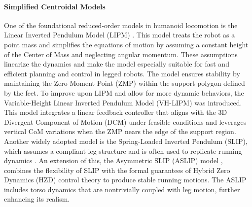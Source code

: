 \documentclass[main.tex]{subfiles}
\begin{document}
\paragraph{Simplified Centroidal Models} One of the foundational reduced-order models in humanoid locomotion is the Linear Inverted Pendulum Model (LIPM) \cite{kajita1991study}. This model treats the robot as a point mass and simplifies the equations of motion by assuming a constant height of the Center of Mass and neglecting angular momentum. These assumptions linearize the dynamics and make the model especially suitable for fast and efficient planning and control in legged robots. The model ensures stability by maintaining the Zero Moment Point (ZMP) within the support polygon defined by the feet. To improve upon LIPM and allow for more dynamic behaviors, the Variable-Height Linear Inverted Pendulum Model (VH-LIPM) \cite{caron2020biped} was introduced. This model integrates a linear feedback controller that aligns with the 3D Divergent Component of Motion (DCM) \cite{englsberger2015three} under feasible conditions and leverages vertical CoM variations when the ZMP nears the edge of the support region. Another widely adopted model is the Spring-Loaded Inverted Pendulum (SLIP), which assumes a compliant leg structure and is often used to replicate running dynamics \cite{full1999templates, holmes2006dynamics}. An extension of this, the Asymmetric SLIP (ASLIP) model \cite{poulakakis2009spring}, combines the flexibility of SLIP with the formal guarantees of Hybrid Zero Dynamics (HZD) \cite{westervelt2003hybrid} control theory to produce stable running motions. The ASLIP includes torso dynamics that are nontrivially coupled with leg motion, further enhancing its realism.
\end{document}

